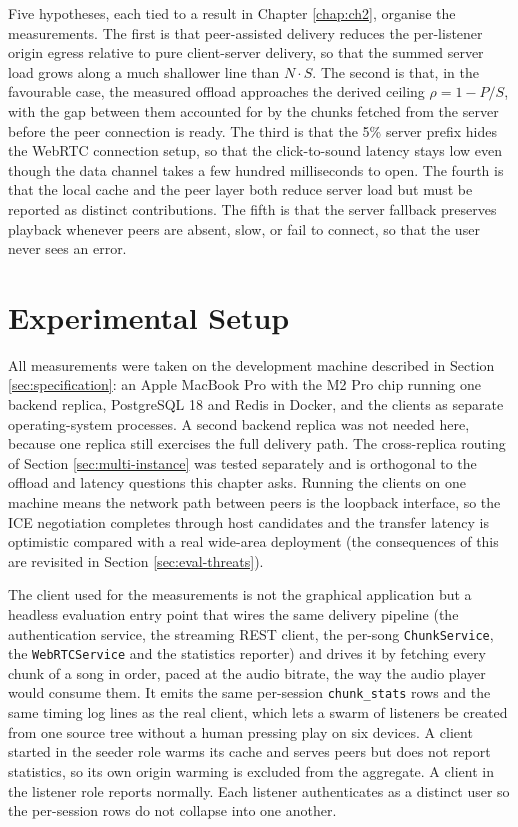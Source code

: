 \par Five hypotheses, each tied to a result in Chapter \ref{chap:ch2}, organise the measurements. The first is that peer-assisted delivery reduces the per-listener origin egress relative to pure client-server delivery, so that the summed server load grows along a much shallower line than $N \cdot S$. The second is that, in the favourable case, the measured offload approaches the derived ceiling $\rho = 1 - P/S$, with the gap between them accounted for by the chunks fetched from the server before the peer connection is ready. The third is that the 5\% server prefix hides the WebRTC connection setup, so that the click-to-sound latency stays low even though the data channel takes a few hundred milliseconds to open. The fourth is that the local cache and the peer layer both reduce server load but must be reported as distinct contributions. The fifth is that the server fallback preserves playback whenever peers are absent, slow, or fail to connect, so that the user never sees an error.

\section{Experimental Setup}
\label{sec:eval-setup}

\indent \par All measurements were taken on the development machine described in Section \ref{sec:specification}: an Apple MacBook Pro with the M2 Pro chip running one backend replica, PostgreSQL 18 and Redis in Docker, and the clients as separate operating-system processes. A second backend replica was not needed here, because one replica still exercises the full delivery path. The cross-replica routing of Section \ref{sec:multi-instance} was tested separately and is orthogonal to the offload and latency questions this chapter asks. Running the clients on one machine means the network path between peers is the loopback interface, so the ICE negotiation completes through host candidates and the transfer latency is optimistic compared with a real wide-area deployment (the consequences of this are revisited in Section \ref{sec:eval-threats}).

\par The client used for the measurements is not the graphical application but a headless evaluation entry point that wires the same delivery pipeline (the authentication service, the streaming REST client, the per-song \texttt{ChunkService}, the \texttt{WebRTCService} and the statistics reporter) and drives it by fetching every chunk of a song in order, paced at the audio bitrate, the way the audio player would consume them. It emits the same per-session \texttt{chunk\_stats} rows and the same timing log lines as the real client, which lets a swarm of listeners be created from one source tree without a human pressing play on six devices. A client started in the seeder role warms its cache and serves peers but does not report statistics, so its own origin warming is excluded from the aggregate. A client in the listener role reports normally. Each listener authenticates as a distinct user so the per-session rows do not collapse into one another.

